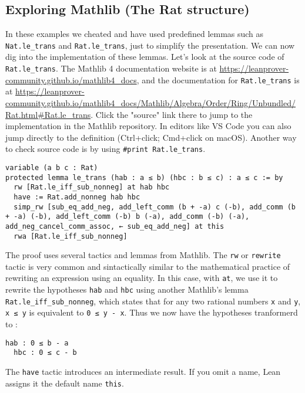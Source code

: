 \subsection{Exploring Mathlib (The Rat structure)}
In these examples we cheated and have used predefined lemmas such as
\lstinline[language=lean]|Nat.le_trans| and
\lstinline[language=lean]|Rat.le_trans|, just to simplify the presentation.
We can now dig into the implementation of these lemmas.
Let's look at the source code of \lstinline[language=lean]|Rat.le_trans|.
The Mathlib 4 documentation website is at
\url{https://leanprover-community.github.io/mathlib4_docs}, and
the documentation for
\lstinline[language=lean]|Rat.le_trans| is at
\url{https://leanprover-community.github.io/mathlib4_docs/Mathlib/Algebra/Order/Ring/Unbundled/Rat.html#Rat.le_trans}.
Click the "source" link there to jump to the implementation in the Mathlib repository. In editors like
VS Code you can also jump directly to the definition (Ctrl+click; Cmd+click on macOS).
Another way to check source code is by using \lstinline[language=lean]|#print Rat.le_trans|.
\begin{lstlisting}[language=lean]
variable (a b c : Rat)
protected lemma le_trans (hab : a ≤ b) (hbc : b ≤ c) : a ≤ c := by
  rw [Rat.le_iff_sub_nonneg] at hab hbc
  have := Rat.add_nonneg hab hbc
  simp_rw [sub_eq_add_neg, add_left_comm (b + -a) c (-b), add_comm (b + -a) (-b), add_left_comm (-b) b (-a), add_comm (-b) (-a), add_neg_cancel_comm_assoc, ← sub_eq_add_neg] at this
  rwa [Rat.le_iff_sub_nonneg]
\end{lstlisting}
The proof uses several tactics and lemmas from Mathlib.
The \lstinline[language=lean]|rw| or \lstinline[language=lean]|rewrite| tactic
is very common and sintactically similar to
the mathematical practice of rewriting an expression using an equality.
In this case, with \lstinline[language=lean]|at|, we use it to rewrite the
hypotheses \lstinline[language=lean]|hab|
and \lstinline[language=lean]|hbc|
using another Mathlib's lemma \lstinline[language=lean]|Rat.le_iff_sub_nonneg|,
which states that for any two rational numbers \lstinline[language=lean]|x| and
\lstinline[language=lean]|y|, \lstinline[language=lean]|x ≤ y|
is equivalent to \lstinline[language=lean]|0 ≤ y - x|.
Thus we now have the hypotheses tranformerd to :
\begin{lstlisting}[language=lean]
  hab : 0 ≤ b - a
  hbc : 0 ≤ c - b
\end{lstlisting}
The \lstinline[language=lean]|have| tactic introduces an intermediate result.
If you omit a name, Lean assigns it the default name \lstinline[language=lean]|this|.
